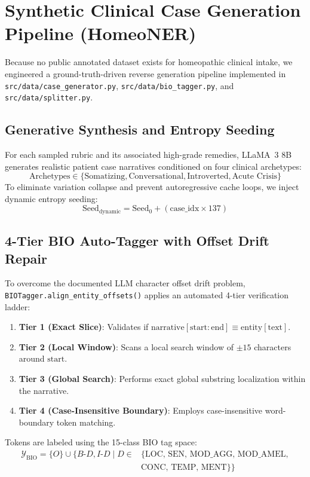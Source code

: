 \begin{sloppypar}
\section{Synthetic Clinical Case Generation Pipeline (HomeoNER)}
Because no public annotated dataset exists for homeopathic clinical intake, we engineered a ground-truth-driven reverse generation pipeline implemented in \texttt{src/data/case\_generator.py}, \texttt{src/data/bio\_tagger.py}, and \texttt{src/data/splitter.py}.

\subsection{Generative Synthesis and Entropy Seeding}
For each sampled rubric and its associated high-grade remedies, LLaMA~3 8B generates realistic patient case narratives conditioned on four clinical archetypes:
\begin{equation}
    \text{Archetypes} \in \{\text{Somatizing}, \text{Conversational}, \text{Introverted}, \text{Acute Crisis}\}
\end{equation}
To eliminate variation collapse and prevent autoregressive cache loops, we inject dynamic entropy seeding:
\begin{equation}
    \text{Seed}_{\text{dynamic}} = \text{Seed}_0 + (\text{case\_idx} \times 137)
\end{equation}

\subsection{4-Tier BIO Auto-Tagger with Offset Drift Repair}
To overcome the documented LLM character offset drift problem, \texttt{BIOTagger.align\_entity\_offsets()} applies an automated 4-tier verification ladder:
\begin{enumerate}
    \item \textbf{Tier 1 (Exact Slice)}: Validates if $\text{narrative}[\text{start}:\text{end}] \equiv \text{entity}[\text{text}]$.
    \item \textbf{Tier 2 (Local Window)}: Scans a local search window of $\pm 15$ characters around $\text{start}$.
    \item \textbf{Tier 3 (Global Search)}: Performs exact global substring localization within the narrative.
    \item \textbf{Tier 4 (Case-Insensitive Boundary)}: Employs case-insensitive word-boundary token matching.
\end{enumerate}
Tokens are labeled using the 15-class BIO tag space:
\begin{equation}
\begin{aligned}
    \mathcal{Y}_{\text{BIO}} = \{O\} \cup \{B\text{-}D, I\text{-}D \mid D \in {}&\{\text{LOC, SEN, MOD\_AGG, MOD\_AMEL},\\
    &\text{CONC, TEMP, MENT}\}\}
\end{aligned}
\end{equation}


\end{sloppypar}
